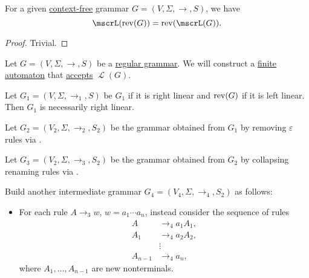 \begin{proposition}\label{thm:reverse_grammar_language}
  For a given \hyperref[def:chomsky_hierarchy/context_free]{context-free} grammar \( G = (V, \Sigma, \to, S) \), we have
  \begin{equation*}
    \mscrL(\op{rev}(G)) = \op{rev}(\mscrL(G)).
  \end{equation*}
\end{proposition}
\begin{proof}
  Trivial.
\end{proof}

\begin{algorithm}\label{alg:finite_automaton_from_regular_grammar}
  Let \( G = (V, \Sigma, \to, S) \) be a \hyperref[def:chomsky_hierarchy/regular]{regular grammar}. We will construct a \hyperref[def:finite_automaton]{finite automaton} that \hyperref[def:finite_automaton/language]{accepts} \( \mscrL(G) \).

  \begin{thmenum}
     Let \( G_1 = (V, \Sigma, \to_1, S) \) be \( G_1 \) if it is right linear and \( \operatorname{rev}(G) \) if it is left linear. Then \( G_1 \) is necessarily right linear.

     Let \( G_2 = (V_2, \Sigma, \to_2, S_2) \) be the grammar obtained from \( G_1 \) by removing \( \varepsilon \) rules via .

     Let \( G_3 = (V_2, \Sigma, \to_3, S_2) \) be the grammar obtained from \( G_2 \) by collapsing renaming rules via .

     Build another intermediate grammar \( G_4 = (V_4, \Sigma, \to_4, S_2) \) as follows:
    \begin{itemize}
      \item For each rule \( A \to_3 w \), \( w = a_1 \cdots a_n \), instead consider the sequence of rules
      \begin{align*}
        A       &\to_4 a_1 A_1, \\
        A_1     &\to_4 a_2 A_2, \\
                &\vdots \\
        A_{n-1} &\to_4 a_n,
      \end{align*}
      where \( A_1, \ldots, A_{n-1} \) are new nonterminals.


\end{itemize}
\end{thmenum}
\end{algorithm}
